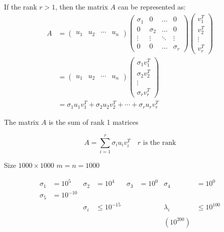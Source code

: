 If the rank \( r > 1 \), then the matrix \( A \) can be represented as:
$$
\begin{aligned}
A &= \begin{pmatrix}
    u_1 & u_2 & \cdots & u_n
    \end{pmatrix}
\begin{pmatrix}
\sigma_1 & 0 & \ldots & 0 \\
0 & \sigma_2 & \ldots & 0 \\
\vdots & \vdots & \ddots & \vdots \\
0 & 0 & \ldots & \sigma_r
\end{pmatrix} \begin{pmatrix}
v_1^T \\
v_2^T \\
\vdots \\
v_r^T
\end{pmatrix} \\
&=
\begin{pmatrix}
u_1 & u_2 & \cdots & u_n
\end{pmatrix}
\begin{pmatrix}
\sigma_1 v_1^T \\
\sigma_2 v_2^T \\
\vdots \\
\sigma_r v_r^T
\end{pmatrix} \\
&=
\sigma_1 u_1 v_1^T + \sigma_2 u_2 v_2^T + \cdots + \sigma_r u_r v_r^T
\end{aligned}
$$

The matrix \( A \) is the sum of rank 1 matrices

\[
A = \sum_{i=1}^{r} \sigma_i u_i v_i^T \quad r \text{ is the rank}
\]

Size \( 1000 \times 1000 \) \quad \( m = n = 1000 \)

\[
\begin{aligned}
\sigma_1 &= 10^5 & \sigma_2 &= 10^4 & \sigma_3 &= 10^0 & \sigma_4 &= 10^0 \\
\sigma_5 &= 10^{-10} & & & & & & \\
& & \sigma_i &\leq 10^{-15} & & & \lambda_i &\leq 10^{100} \\
& & & & & & & \\
& & & & & & \left(10^{200}\right) & \\
\end{aligned}
\]
